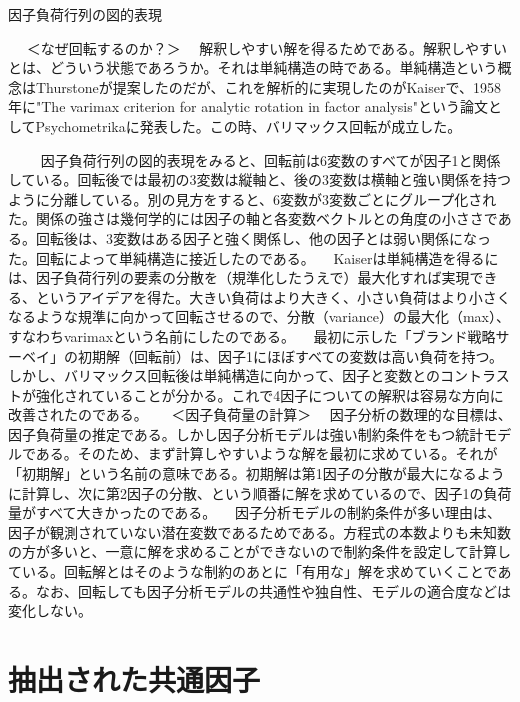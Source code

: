 \documentclass[a4j,11pt,mc]{jreport}
\begin{document}
	因子負荷行列の図的表現
	　

	　
	＜なぜ回転するのか？＞
	　解釈しやすい解を得るためである。解釈しやすいとは、どういう状態であろうか。それは単純構造の時である。単純構造という概念はThurstoneが提案したのだが、これを解析的に実現したのがKaiserで、1958年に"The varimax criterion for analytic rotation in factor analysis"という論文としてPsychometrikaに発表した。この時、バリマックス回転が成立した。
	　

	　
	　因子負荷行列の図的表現をみると、回転前は6変数のすべてが因子1と関係している。回転後では最初の3変数は縦軸と、後の3変数は横軸と強い関係を持つように分離している。別の見方をすると、6変数が3変数ごとにグループ化された。関係の強さは幾何学的には因子の軸と各変数ベクトルとの角度の小ささである。回転後は、3変数はある因子と強く関係し、他の因子とは弱い関係になった。回転によって単純構造に接近したのである。
	　Kaiserは単純構造を得るには、因子負荷行列の要素の分散を（規準化したうえで）最大化すれば実現できる、というアイデアを得た。大きい負荷はより大きく、小さい負荷はより小さくなるような規準に向かって回転させるので、分散（variance）の最大化（max）、すなわちvarimaxという名前にしたのである。
	　最初に示した「ブランド戦略サーベイ」の初期解（回転前）は、因子1にほぼすべての変数は高い負荷を持つ。しかし、バリマックス回転後は単純構造に向かって、因子と変数とのコントラストが強化されていることが分かる。これで4因子についての解釈は容易な方向に改善されたのである。
	 　
	＜因子負荷量の計算＞
	　因子分析の数理的な目標は、因子負荷量の推定である。しかし因子分析モデルは強い制約条件をもつ統計モデルである。そのため、まず計算しやすいような解を最初に求めている。それが「初期解」という名前の意味である。初期解は第1因子の分散が最大になるように計算し、次に第2因子の分散、という順番に解を求めているので、因子1の負荷量がすべて大きかったのである。
	　因子分析モデルの制約条件が多い理由は、因子が観測されていない潜在変数であるためである。方程式の本数よりも未知数の方が多いと、一意に解を求めることができないので制約条件を設定して計算している。回転解とはそのような制約のあとに「有用な」解を求めていくことである。なお、回転しても因子分析モデルの共通性や独自性、モデルの適合度などは変化しない。


\section{抽出された共通因子}
\end{document}
